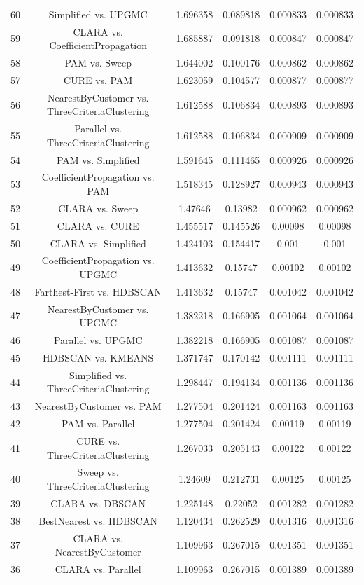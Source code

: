 \documentclass[a4paper,10pt]{article}
\begin{document}
\begin{landscape}
\begin{table}[!htp]
\begin{tabular}{cccccc}
60&Simplified vs. UPGMC&1.696358&0.089818&0.000833&0.000833\\
59&CLARA vs. CoefficientPropagation&1.685887&0.091818&0.000847&0.000847\\
58&PAM vs. Sweep&1.644002&0.100176&0.000862&0.000862\\
57&CURE vs. PAM&1.623059&0.104577&0.000877&0.000877\\
56&NearestByCustomer vs. ThreeCriteriaClustering&1.612588&0.106834&0.000893&0.000893\\
55&Parallel vs. ThreeCriteriaClustering&1.612588&0.106834&0.000909&0.000909\\
54&PAM vs. Simplified&1.591645&0.111465&0.000926&0.000926\\
53&CoefficientPropagation vs. PAM&1.518345&0.128927&0.000943&0.000943\\
52&CLARA vs. Sweep&1.47646&0.13982&0.000962&0.000962\\
51&CLARA vs. CURE&1.455517&0.145526&0.00098&0.00098\\
50&CLARA vs. Simplified&1.424103&0.154417&0.001&0.001\\
49&CoefficientPropagation vs. UPGMC&1.413632&0.15747&0.00102&0.00102\\
48&Farthest-First vs. HDBSCAN&1.413632&0.15747&0.001042&0.001042\\
47&NearestByCustomer vs. UPGMC&1.382218&0.166905&0.001064&0.001064\\
46&Parallel vs. UPGMC&1.382218&0.166905&0.001087&0.001087\\
45&HDBSCAN vs. KMEANS&1.371747&0.170142&0.001111&0.001111\\
44&Simplified vs. ThreeCriteriaClustering&1.298447&0.194134&0.001136&0.001136\\
43&NearestByCustomer vs. PAM&1.277504&0.201424&0.001163&0.001163\\
42&PAM vs. Parallel&1.277504&0.201424&0.00119&0.00119\\
41&CURE vs. ThreeCriteriaClustering&1.267033&0.205143&0.00122&0.00122\\
40&Sweep vs. ThreeCriteriaClustering&1.24609&0.212731&0.00125&0.00125\\
39&CLARA vs. DBSCAN&1.225148&0.22052&0.001282&0.001282\\
38&BestNearest vs. HDBSCAN&1.120434&0.262529&0.001316&0.001316\\
37&CLARA vs. NearestByCustomer&1.109963&0.267015&0.001351&0.001351\\
36&CLARA vs. Parallel&1.109963&0.267015&0.001389&0.001389\\

\end{tabular}
\end{table}
\end{landscape}
\end{document}
